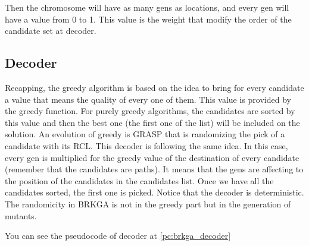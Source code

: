 \documentclass[]{report}
\begin{document}
Then the chromosome will have as many gens as locations, and every gen will have a value from 0 to 1. This value is the weight that modify the order of the candidate set at decoder.

\subsection{Decoder}\label{ss:brkga_decoder}

Recapping, the greedy algorithm is based on the idea to bring for every candidate a value that means the quality of every one of them. This value is provided by the greedy function. For purely greedy algorithms, the candidates are sorted by this value and then the best one (the first one of the list) will be included on the solution. An evolution of greedy is GRASP that is randomizing the pick of a candidate with its RCL. This decoder is following the same idea. In this case, every gen is multiplied for the greedy value of the destination of every candidate (remember that the candidates are paths). It means that the gens are affecting to the position of the candidates in the candidates list. Once we have all the candidates sorted, the first one is picked. Notice that the decoder is deterministic. The randomicity in BRKGA is not in the greedy part but in the generation of mutants.

You can see the pseudocode of decoder at \ref{pc:brkga_decoder}
\end{document}
